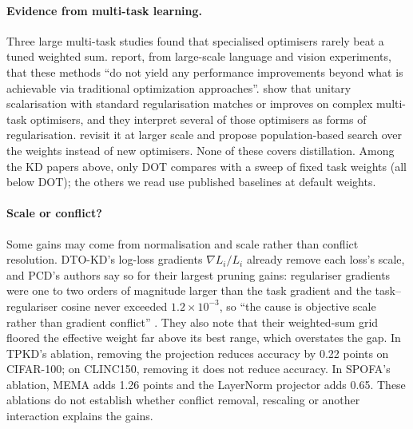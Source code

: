 \paragraph{Evidence from multi-task learning.}
Three large multi-task studies found that specialised optimisers rarely beat a tuned
weighted sum. \citet{xin2022mtohelp} report, from large-scale language and vision experiments, that these methods ``do not yield any performance improvements beyond what is achievable
via traditional optimization approaches''. \citet{kurin2022unitary} show that unitary
scalarisation with standard regularisation matches or improves on complex multi-task optimisers,
and they interpret several of those optimisers as forms of regularisation. \citet{royer2023scalarization}
revisit it at larger scale and propose population-based search over the weights instead of new
optimisers. None of these covers distillation. Among the KD papers above, only DOT compares with a
sweep of fixed task weights (all below DOT); the others we read use published baselines at default
weights.

\paragraph{Scale or conflict?}
Some gains may come from normalisation and scale rather than conflict resolution. DTO-KD's
log-loss gradients $\nabla L_i/L_i$ already remove each loss's scale, and PCD's authors say so for
their largest pruning gains: regulariser gradients were one to two orders of magnitude larger than
the task gradient and the task--regulariser cosine never exceeded $1.2\times10^{-3}$, so ``the cause
is objective scale rather than gradient conflict'' \citep{varam2026pcd}. They also note that
their weighted-sum grid floored the effective weight far above its best range, which overstates
the gap. In TPKD's ablation, removing the projection reduces accuracy by 0.22 points on CIFAR-100; on CLINC150, removing it does not reduce accuracy. In SPOFA's ablation, MEMA adds 1.26 points and the LayerNorm projector adds 0.65. These ablations do not establish whether conflict removal, rescaling or another interaction explains the gains.

